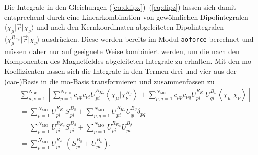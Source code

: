 	Die Integrale in den Gleichungen (\ref{eq:ddipx})--(\ref{eq:dipz}) lassen sich damit entsprechend durch eine Linearkombination von gewöhnlichen Dipolintegralen $\langle\chi_\mu\vert\vec{r}\vert\chi_\nu\rangle$ und nach den Kernkoordinaten abgeleiteten Dipolintegralen $\langle\chi_\mu^{R_{K_\alpha}}\vert\vec{r}\vert\chi_\nu\rangle$ ausdrücken. Diese werden bereits im Modul \texttt{aoforce} berechnet und müssen daher nur auf geeignete Weise kombiniert werden, um die nach den Komponenten des Magnetfeldes abgeleiteten Integrale zu erhalten. Mit den \ac{mo}-Koeffizienten lassen sich die Integrale in den Termen drei und vier aus der \mbox{(\acs{cao}-)}Basis in die \ac{mo}-Basis transformieren und zusammenfassen zu\supercite{nicu2008vibrational}	
	\begin{equation}\label{eq:term3+4}
	\begin{aligned}
	&\sum_{\mu,\nu=1}^{N_{\text{BF}}}\left[\sum_{p=1}^{N_{\text{MO}}}c_{\mu p}c_{\nu i}U_{pi}^{R_{K_\alpha}}\left\langle\chi_\mu\vert\chi_\nu^{B_{\beta}}\right\rangle+\sum_{p,q=1}^{N_{\text{MO}}}c_{\mu p}c_{\nu q}U_{pi}^{R_{K_\alpha}}U_{qi}^{B_\beta}\left\langle\chi_\mu\vert\chi_\nu\right\rangle\right]\\
	&=\sum_{p=1}^{N_{\text{MO}}}U_{pi}^{R_{K_\alpha}}S_{pi}^{B_\beta}+\sum_{p,q=1}^{N_{\text{MO}}}U_{pi}^{R_{K_\alpha}}U_{qi}^{B_\beta}\delta_{pq}\\
	&=\sum_{p=1}^{N_{\text{MO}}}U_{pi}^{R_{K_\alpha}}S_{pi}^{B_\beta}+\sum_{p=1}^{N_{\text{MO}}}U_{pi}^{R_{K_\alpha}}U_{pi}^{B_\beta}\\
	&=\sum_{p=1}^{N_{\text{MO}}}U_{pi}^{R_{K_\alpha}}\left(S_{pi}^{B_\beta}+U_{pi}^{B_\beta}\right).
	\end{aligned}
	\end{equation}
	
